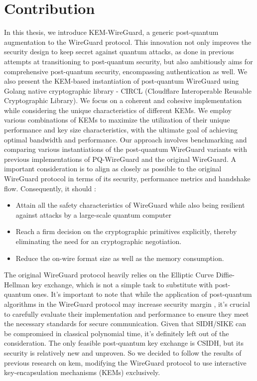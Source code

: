 \section{Contribution}

In this thesis, we introduce KEM-WireGuard, a generic post-quantum augmentation to the WireGuard protocol. This innovation not only improves the security design to keep secret against quantum attacks, as done in previous attempts at transitioning to post-quantum security, but also ambitiously aims for comprehensive post-quantum security, encompassing authentication as well. We also present the KEM-based instantiation of post-quantum WireGuard using Golang native cryptographic library - CIRCL (Cloudflare Interoperable Reusable Cryptographic Library). We focus on a coherent and cohesive implementation while considering the unique characteristics of different KEMs. We employ various combinations of KEMs to maximize the utilization of their unique performance and key size characteristics, with the ultimate goal of achieving optimal bandwidth and performance.
Our approach involves benchmarking and comparing various instantiations of the post-quantum WireGuard variants with previous implementations of PQ-WireGuard and the original WireGuard. A important consideration is to align as closely as possible to the original WireGuard protocol in terms of its security, performance metrics and handshake flow. Consequently, it should :
\begin{itemize}
\item Attain all the safety characteristics of WireGuard while also being resilient against attacks by a large-scale quantum computer
\item Reach a firm decision on the cryptographic primitives explicitly, thereby eliminating the need for an cryptographic negotiation.
\item Reduce the on-wire format size as well as the memory consumption.
\end{itemize}
The original WireGuard protocol heavily relies on the Elliptic Curve Diffie-Hellman key exchange, which is not a simple task to substitute with post-quantum ones. It's important to note that while the application of post-quantum algorithms in the WireGuard protocol may increase security margin , it's crucial to carefully evaluate their implementation and performance to ensure they meet the necessary standards for secure communication.  Given that SIDH/SIKE can be compromised in classical polynomial time, it's definitely left out of the consideration. The only feasible post-quantum  key exchange is CSIDH, but its security is relatively new and unproven. So we decided to follow the results of previous research on kem, modifying the WireGuard protocol to use interactive key-encapsulation mechanisms (KEMs) exclusively.
